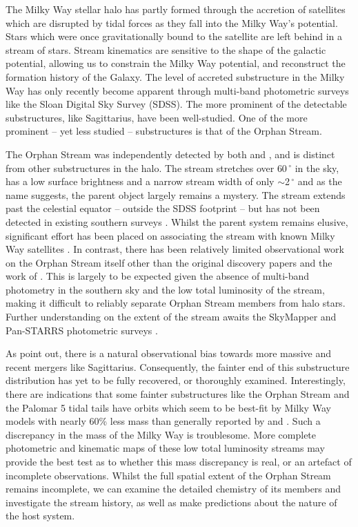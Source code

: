 \documentclass[10pt,apjl]{emulateapj}
\begin{document}
The Milky Way stellar halo has partly formed through the accretion of satellites which are disrupted by tidal forces as they fall into the Milky Way's potential. Stars which were once gravitationally bound to the satellite are left behind in a stream of stars. Stream kinematics are sensitive to the shape of the galactic potential, allowing us to constrain the Milky Way potential, and reconstruct the formation history of the Galaxy. The level of accreted substructure in the Milky Way has only recently become apparent through multi-band photometric surveys like the Sloan Digital Sky Survey (SDSS). The more prominent of the detectable substructures, like Sagittarius, have been well-studied. One of the more prominent \--- yet less studied \--- substructures is that of the Orphan Stream. 

The Orphan Stream was independently detected by both \citet{Grillmair_Dionatos_2006} and \citet{Belokurov_et-al_2006}, and is distinct from other substructures in the halo. The stream stretches over $60\,^\circ$ in the sky, has a low surface brightness and a narrow stream width of only $\sim$2\,$^\circ$ and as the name suggests, the parent object largely remains a mystery. The stream extends past the celestial equator \--- outside the SDSS footprint \--- but has not been detected in existing southern surveys \citep{Newberg_et-al_2010}. Whilst the parent system remains elusive, significant effort has been placed on associating the stream with known Milky Way satellites \citep{Zucker_et-al_2006, Fellhaur_et-al_2007,Jin_Lynden_Bell_2007,Sales_et-al_2008}. In contrast, there has been relatively limited observational work on the Orphan Stream itself other than the original discovery papers \citep{Grillmair_Dionatos_2006, Belokurov_et-al_2006, Belokurov_et-al_2007} and the work of \citet{Newberg_et-al_2010}. This is largely to be expected given the absence of multi-band photometry in the southern sky and the low total luminosity of the stream, making it difficult to reliably separate Orphan Stream members from halo stars. Further understanding on the extent of the stream awaits the SkyMapper and Pan-STARRS photometric surveys \citep{Keller_et-al_2007, Hodapp_et-al_2004}.

As \citet{Sales_et-al_2008} point out, there is a natural observational bias towards more massive and recent mergers like Sagittarius. Consequently, the fainter end of this substructure distribution has yet to be fully recovered, or thoroughly examined. Interestingly, there are indications that  some fainter substructures like the Orphan Stream and the Palomar 5 tidal tails \citep{Odenkirchen_et-al_2009} have orbits which seem to be best-fit by Milky Way models with nearly 60\% less mass \citep{Newberg_et-al_2010} than generally reported by \citet{Xue_et-al_2008} and \citet{Koposov_et-al_2010}. Such a discrepancy in the mass of the Milky Way is troublesome. More complete photometric and kinematic maps of these low total luminosity streams may provide the best test as to whether this mass discrepancy is real, or an artefact of incomplete observations. Whilst the full spatial extent of the Orphan Stream remains incomplete, we can examine the detailed chemistry of its members and investigate the stream history, as well as make predictions about the nature of the host system.
\end{document}
